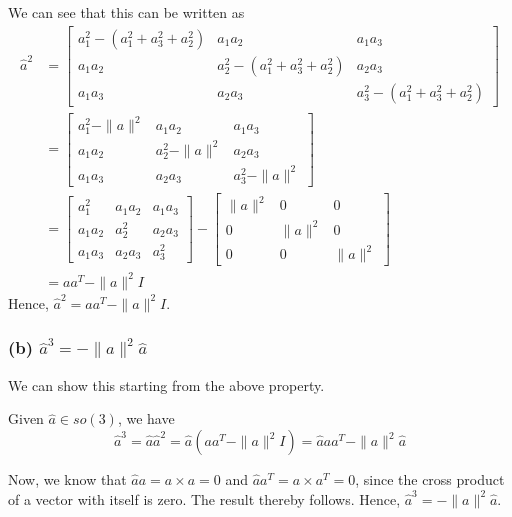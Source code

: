 We can see that this can be written as
\begin{align*}
     \hat{a}^{2}
      & =
     \begin{bmatrix}
          a_{1}^{2}-(a_{1}^{2}+a_{3}^{2}+a_{2}^{2}) & a_{1} a_{2}                               & a_{1} a_{3}                               \\
          a_{1} a_{2}                               & a_{2}^{2}-(a_{1}^{2}+a_{3}^{2}+a_{2}^{2}) & a_{2} a_{3}                               \\
          a_{1} a_{3}                               & a_{2} a_{3}                               & a_{3}^{2}-(a_{1}^{2}+a_{3}^{2}+a_{2}^{2})
     \end{bmatrix}
     \\ & =
     \begin{bmatrix}
          a_{1}^{2}-\|a\|^{2} & a_{1} a_{2}         & a_{1} a_{3}         \\
          a_{1} a_{2}         & a_{2}^{2}-\|a\|^{2} & a_{2} a_{3}         \\
          a_{1} a_{3}         & a_{2} a_{3}         & a_{3}^{2}-\|a\|^{2}
     \end{bmatrix}
     \\ & =
     \begin{bmatrix}
          a_{1}^{2}   & a_{1} a_{2} & a_{1} a_{3} \\
          a_{1} a_{2} & a_{2}^{2}   & a_{2} a_{3} \\
          a_{1} a_{3} & a_{2} a_{3} & a_{3}^{2}
     \end{bmatrix}
     -
     \begin{bmatrix}
          \|a\|^{2} & 0         & 0         \\
          0         & \|a\|^{2} & 0         \\
          0         & 0         & \|a\|^{2}
     \end{bmatrix}
     \\ & =
     a a^{T}-\|a\|^{2} I
\end{align*}
Hence, \( \boxed{ \hat{a}^{2}=a a^{T}-\|a\|^{2} I } \).

\subsubsection*{(b) \( \hat{a}^{3}=-\|a\|^{2} \hat{a} \)}

We can show this starting from the above property.

Given \( \hat{a} \in s o(3) \), we have
\[
     \hat{a}^{3}
     =
     \hat{a} \hat{a}^{2}
     =
     \hat{a} (a a^{T}-\|a\|^{2} I)
     =
     \hat{a} a a^{T}-\|a\|^{2} \hat{a}
\]

Now, we know that \( \hat{a} a = a \times a = 0 \) and \( \hat{a} a^{T} = a \times a^{T} = 0 \), since the cross product of a vector with itself is zero.
The result thereby follows.
Hence, \( \boxed{ \hat{a}^{3}=-\|a\|^{2} \hat{a} } \).
